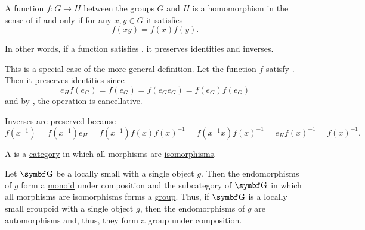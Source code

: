 \begin{Proposition}\label{thm:group_homomorphism_single_condition}
  A function \( f: G \to H \) between the groups \( G \) and \( H \) is a homomorphism in the sense of  if and only if for any \( x, y \in G \) it satisfies
  \begin{equation}\label{thm:group_homomorphism_single_condition/condition}
    f(xy) = f(x) f(y).
  \end{equation}

  In other words, if a function satisfies , it preserves identities and inverses.
\end{Proposition}
\begin{RefListProof}
    \ISufficiency This is a special case of the more general definition.
    \INecessity Let the function \( f \) satisfy . Then it preserves identities since
    \begin{equation*}
      e_H f(e_G) = f(e_G) = f(e_G e_G) = f(e_G) f(e_G)
    \end{equation*}
    and by , the operation is cancellative.

    Inverses are preserved because
    \begin{equation*}
      f(x^{-1})
      =
      f(x^{-1}) e_H
      =
      f(x^{-1}) f(x) f(x)^{-1}
      =
      f(x^{-1} x) f(x)^{-1}
      =
      e_H f(x)^{-1}
      =
      f(x)^{-1}.
    \end{equation*}
\end{RefListProof}

\begin{Definition}\label{def:groupoid}
  A  is a \hyperref[def:category]{category} in which all morphisms are \hyperref[def:morphism_invertibility]{isomorphisms}.
\end{Definition}

\begin{Definition}\label{remark:groupoids}
  Let \( \Bold G \) be a locally small with a single object \( g \). Then the endomorphisms of \( g \) form a \hyperref[def:magma]{monoid} under composition and the subcategory of \( \Bold G \) in which all morphisms are isomorphisms forms a \hyperref[def:magma]{group}. Thus, if \( \Bold G \) is a locally small groupoid with a single object \( g \), then the endomorphisms of \( g \) are automorphisms and, thus, they form a group under composition.
\end{Definition}

